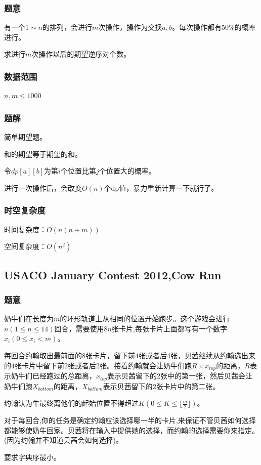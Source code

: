 \documentclass{ctexart}
\begin{document}
\subsubsection{题意}
有一个$1 \sim n$的排列，会进行$m$次操作，操作为交换$a,b$。每次操作都有$50\%$的概率进行。

求进行$m$次操作以后的期望逆序对个数。
\subsubsection{数据范围}
$n,m \le 1000$
\subsubsection{题解}
简单期望题。

和的期望等于期望的和。

令$dp[a][b]$为第$i$个位置比第$j$个位置大的概率。

进行一次操作后，会改变$O(n)$个dp值，暴力重新计算一下就行了。
\subsubsection{时空复杂度}
时间复杂度：$O(n(n+m))$

空间复杂度：$O(n^2)$
\subsection{USACO January Contest 2012,Cow Run}
\subsubsection{题意}
奶牛们在长度为$m$的环形轨道上从相同的位置开始跑步。这个游戏会进行$n(1 \le n \le 14)$回合，需要使用$8n$张卡片,每张卡片上面都写有一个数字$x_i(0 \le x_i < m)$。

每回合约翰取出最前面的$8$张卡片，留下前$4$张或者后$4$张，贝茜继续从约翰选出来的$4$张卡片中留下前$2$张或者后$2$张。接着约翰就会让奶牛们跑$R \times x_{top}$的距离，$R$表示奶牛们已经跑过的总距离，$x_{top}$表示贝茜留下的$2$张中的第一张，然后贝茜会让奶牛们跑$X_{bottom}$的距离，$X_{bottom}$表示贝茜留下的$2$张卡片中的第二张。

约翰认为牛最终离他们的起始位置不得超过$K(0 \le K \le \lfloor \frac{m}{2} \rfloor)$。

对于每回合,你的任务是确定约翰应该选择哪一半的卡片,来保证不管贝茜如何选择都能够使奶牛回家。贝茜将在输入中提供她的选择，而约翰的选择需要你来指定。(因为约翰并不知道贝茜会如何选择)。

要求字典序最小。
\end{document}
